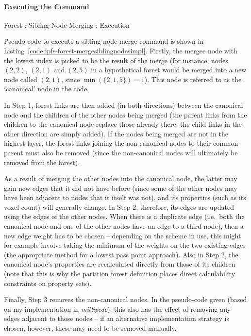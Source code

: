 \paragraph{Executing the Command}

\begin{stulisting}[p]
\caption{Forest : Sibling Node Merging : Execution}
\label{code:ipfs-forest-mergesiblingnodesimpl}

\end{stulisting}

Pseudo-code to execute a sibling node merge command is shown in Listing~\ref{code:ipfs-forest-mergesiblingnodesimpl}. Firstly, the mergee node with the lowest index is picked to be the result of the merge (for instance, nodes $(2,2)$, $(2,1)$ and $(2,5)$ in a hypothetical forest would be merged into a new node called $(2,1)$, since $\min(\{2,1,5\}) = 1$). This node is referred to as the `canonical' node in the code.

In Step 1, forest links are then added (in both directions) between the canonical node and the children of the other nodes being merged (the parent links from the children to the canonical node replace those already there; the child links in the other direction are simply added). If the nodes being merged are not in the highest layer, the forest links joining the non-canonical nodes to their common parent must also be removed (since the non-canonical nodes will ultimately be removed from the forest).

As a result of merging the other nodes into the canonical node, the latter may gain new edges that it did not have before (since some of the other nodes may have been adjacent to nodes that it itself was not), and its properties (such as its voxel count) will generally change. In Step 2, therefore, its edges are updated using the edges of the other nodes. When there is a duplicate edge (i.e.~both the canonical node and one of the other nodes have an edge to a third node), then a new edge weight has to be chosen -- depending on the scheme in use, this might for example involve taking the minimum of the weights on the two existing edges (the appropriate method for a lowest pass point approach). Also in Step 2, the canonical node's properties are recalculated directly from those of its children (note that this is why the partition forest definition places direct calculability constraints on property sets).

Finally, Step 3 removes the non-canonical nodes. In the pseudo-code given (based on my implementation in \emph{millipede}), this also has the effect of removing any edges adjacent to those nodes -- if an alternative implementation strategy is chosen, however, these may need to be removed manually.

